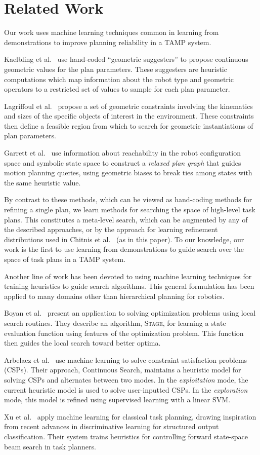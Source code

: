 \section{Related Work}
Our work uses machine learning techniques common in learning from demonstrations to improve
planning reliability in a TAMP system.

Kaelbling et al.~\cite{kaelbling2011hierarchical} use hand-coded ``geometric suggesters'' to propose
continuous geometric values for the plan parameters. These suggesters are heuristic
computations which map information about the robot type and geometric operators to a restricted
set of values to sample for each plan parameter.

Lagriffoul et al.~\cite{lagriffoul2014orientation}
propose a set of geometric constraints involving the kinematics and sizes of the specific objects of
interest in the environment. These constraints then define a feasible region from which to search
for geometric instantiations of plan parameters.

Garrett et al.~\cite{GarrettWAFR14} use information about reachability in the robot configuration
space and symbolic state space to construct a \emph{relaxed plan graph} that guides motion
planning queries, using geometric biases to break ties among states with the same heuristic value.

By contrast to these methods, which can be viewed as hand-coding methods for refining a single plan,
we learn methods for searching the space of high-level task plans. This constitutes a meta-level search,
which can be augmented by any of the described approaches, or by the approach for learning refinement
distributions used in Chitnis et al.~\cite{chitnis2015mlpc} (as in this paper). To our knowledge, our work
is the first to use learning from demonstrations to guide search over the space of task plans in a TAMP system.

Another line of work has been devoted to using machine learning techniques for
training heuristics to guide search algorithms. This general formulation
has been applied to many domains other than hierarchical planning for robotics.

Boyan et al.~\cite{Boyanlearning} present an application to solving optimization
problems using local search routines. They describe an algorithm, \textsc{Stage},
for learning a state evaluation function using features of the optimization problem.
This function then guides the local search toward better optima.

Arbelaez et al.~\cite{hamadisearch} use machine learning to solve constraint
satisfaction problems (CSPs). Their approach, Continuous Search, maintains a heuristic
model for solving CSPs and alternates between two modes. In the \emph{exploitation} mode,
the current heuristic model is used to solve user-inputted CSPs. In the \emph{exploration}
mode, this model is refined using supervised learning with a linear SVM.

Xu et al.~\cite{Xu07discriminativelearning} apply machine learning for classical task
planning, drawing inspiration from recent advances in discriminative learning for
structured output classification. Their system trains heuristics for controlling forward
state-space beam search in task planners.
